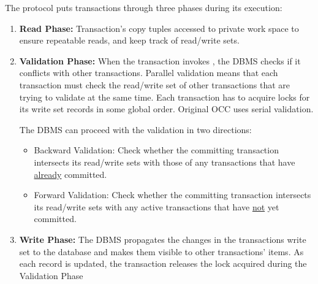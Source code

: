 \documentclass[11pt]{article}
\begin{document}
The protocol puts transactions through three phases during its execution:
\begin{enumerate}
    \item \textbf{Read Phase:}
    Transaction's copy tuples accessed to private work space to ensure repeatable reads, and keep 
    track of read/write sets.
    
    \item \textbf{Validation Phase:}
    When the transaction invokes , the DBMS checks if it conflicts with other 
    transactions. Parallel validation means that each transaction must check the read/write set of 
    other transactions that are trying to validate at the same time. Each transaction has to acquire 
    locks for its write set records in some global order. Original OCC uses serial validation.
    
    The DBMS can proceed with the validation in two directions:
    \begin{itemize}
        \item Backward Validation:
        Check whether the committing transaction intersects its read/write sets with those of any 
        transactions that have \underline{already} committed.
        
        \item Forward Validation:
        Check whether the committing transaction intersects its read/write sets with any active 
        transactions that have \underline{not} yet committed.
    \end{itemize}
    
    \item \textbf{Write Phase:}
    The DBMS propagates the changes in the transactions write set to the database and makes them 
    visible to other transactions' items. As each record is updated, the transaction releases the 
    lock acquired during the Validation Phase
\end{enumerate}

\end{document}

